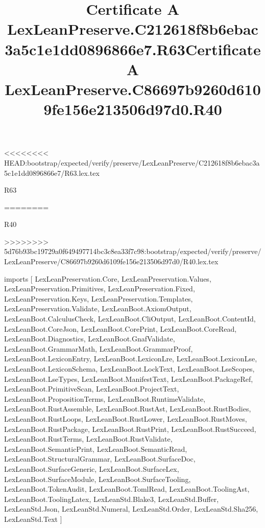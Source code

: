 <<<<<<<< HEAD:bootstrap/expected/verify/preserve/LexLeanPreserve/C212618f8b6ebac3a5c1e1dd0896866e7/R63.lex.tex
\begin{lexlean}{R63}
\title{Certificate A LexLeanPreserve.C212618f8b6ebac3a5c1e1dd0896866e7.R63}
========
\begin{lexlean}{R40}
\title{Certificate A LexLeanPreserve.C86697b9260d6109fe156e213506d97d0.R40}
>>>>>>>> 5d76b93bc19729a0f649497714bc3c8ea33f7c98:bootstrap/expected/verify/preserve/LexLeanPreserve/C86697b9260d6109fe156e213506d97d0/R40.lex.tex
\begin{coremodule}
imports [
  LexLeanPreservation.Core,
  LexLeanPreservation.Values,
  LexLeanPreservation.Primitives,
  LexLeanPreservation.Fixed,
  LexLeanPreservation.Keys,
  LexLeanPreservation.Templates,
  LexLeanPreservation.Validate,
  LexLeanBoot.AxiomOutput,
  LexLeanBoot.CalculusCheck,
  LexLeanBoot.CliOutput,
  LexLeanBoot.ContentId,
  LexLeanBoot.CoreJson,
  LexLeanBoot.CorePrint,
  LexLeanBoot.CoreRead,
  LexLeanBoot.Diagnostics,
  LexLeanBoot.GnafValidate,
  LexLeanBoot.GrammarMath,
  LexLeanBoot.GrammarProof,
  LexLeanBoot.LexiconEntry,
  LexLeanBoot.LexiconLre,
  LexLeanBoot.LexiconLse,
  LexLeanBoot.LexiconSchema,
  LexLeanBoot.LockText,
  LexLeanBoot.LseScopes,
  LexLeanBoot.LseTypes,
  LexLeanBoot.ManifestText,
  LexLeanBoot.PackageRef,
  LexLeanBoot.PrimitiveScan,
  LexLeanBoot.ProjectText,
  LexLeanBoot.PropositionTerms,
  LexLeanBoot.RuntimeValidate,
  LexLeanBoot.RustAssemble,
  LexLeanBoot.RustAst,
  LexLeanBoot.RustBodies,
  LexLeanBoot.RustLoops,
  LexLeanBoot.RustLower,
  LexLeanBoot.RustMoves,
  LexLeanBoot.RustPackage,
  LexLeanBoot.RustPrint,
  LexLeanBoot.RustSucceed,
  LexLeanBoot.RustTerms,
  LexLeanBoot.RustValidate,
  LexLeanBoot.SemanticPrint,
  LexLeanBoot.SemanticRead,
  LexLeanBoot.StructuralGrammar,
  LexLeanBoot.SurfaceDoc,
  LexLeanBoot.SurfaceGeneric,
  LexLeanBoot.SurfaceLex,
  LexLeanBoot.SurfaceModule,
  LexLeanBoot.SurfaceTooling,
  LexLeanBoot.TokenAudit,
  LexLeanBoot.TomlRead,
  LexLeanBoot.ToolingAst,
  LexLeanBoot.ToolingLatex,
  LexLeanStd.Blake3,
  LexLeanStd.Buffer,
  LexLeanStd.Json,
  LexLeanStd.Numeral,
  LexLeanStd.Order,
  LexLeanStd.Sha256,
  LexLeanStd.Text
]


\end{coremodule}
\end{lexlean}
\end{lexlean}
